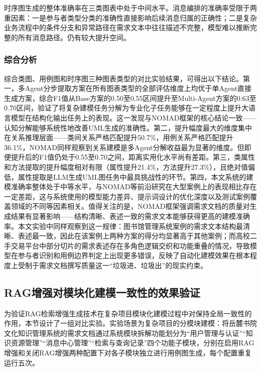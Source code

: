 时序图生成的整体准确率在三类图表中处于中间水平。消息编排的准确率受限于两重因素：一是参与者类型分类的准确性直接影响后续消息归属的正确性；二是复杂业务流程中的条件分支和异常路径在需求文本中往往描述不完整，模型难以推断完整的所有消息路径。仍有较大提升空间。

\subsubsection{综合分析}

综合类图、用例图和时序图三种图表类型的对比实验结果，可得出以下结论。第一，多Agent分步提取方案在所有图表类型的全部评估维度上均优于单Agent直接生成方案，综合F1值从Base方案的0.50至0.55区间提升至Multi-Agent方案的0.63至0.70区间，验证了将复杂建模任务分解为专业化子任务能够在一定程度上提升大语言模型在结构化输出任务上的表现。这一发现与NOMAD框架的核心结论一致——认知分解能够系统性地改善UML生成的准确性\cite{giannouris2025nomad}。第二，提升幅度最大的维度集中在关系推理层面——类间关系严格匹配提升50.7\%，用例关系严格匹配提升36.1\%，NOMAD同样观察到关系建模是多Agent分解收益最为显著的维度。但即便提升后的F1值仍处于0.55至0.70之间，距离实用化水平尚有差距。第三，类属性和方法提取的提升幅度相对有限（属性提升21.4\%，方法提升27.3\%），且绝对值偏低，属性提取是LLM生成UML图任务中最具挑战性的环节。第四，本文系统的建模准确率整体处于中等水平，与NOMAD等前沿研究在大型案例上的表现相比存在一定差距，这与系统使用的模型能力差异、提示词设计的优化深度以及测试案例覆盖领域的不同等因素相关。值得关注的是，NOMAD框架强调需求文档的质量对生成结果有显著影响——结构清晰、表述一致的需求文本能够获得更高的建模准确率。本文实验中同样观察到这一规律：图书馆管理系统案例的需求文本结构最清晰、表述最一致，因此在该案例上两种方案的得分均显著高于其他案例；而高校二手交易平台中部分切片的需求表述存在多角色逻辑交织和功能重叠的情况，导致模型在参与者识别和用例边界判定上出现更多错误，反映了自动化建模效果在根本程度上受制于需求文档撰写质量这一“垃圾进、垃圾出”的现实约束。

\subsection{RAG增强对模块化建模一致性的效果验证}

为验证RAG检索增强生成技术在复杂项目模块化建模过程中对保持全局一致性的作用，本节设计了一组对比实验。实验场景为复杂项目的分模块建模：将岳麓书院文化知识管理系统的需求文档通过系统模块拆解功能划分为“用户管理与认证”“知识资源管理”“消息中心管理”“检索与查询记录”四个功能子模块，分别在启用RAG增强和关闭RAG增强两种配置下对各子模块独立进行用例图生成，每个配置重复运行五次。

